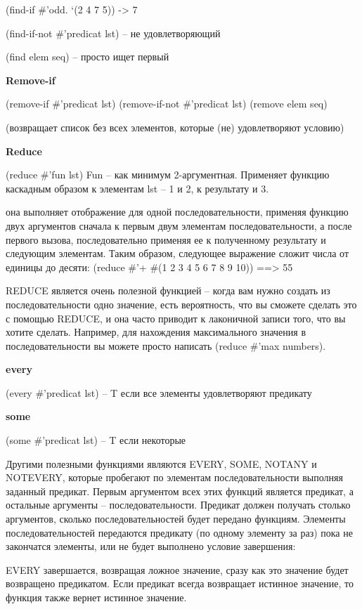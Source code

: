 \documentclass[12pt]{report}
\begin{document}
(find-if \#’odd. ‘(2 4 7 5)) -> 7

(find-if-not \#’predicat lst) – не удовлетворяющий

(find elem seq) -- просто ищет первый

\textbf{Remove-if}

(remove-if \#’predicat lst)
(remove-if-not \#’predicat lst)
(remove elem seq)

(возвращает список без всех элементов, которые (не) удовлетворяют условию)

\textbf{Reduce}

(reduce \#’fun lst)
Fun – как минимум 2-аргументная. Применяет функцию каскадным образом к элементам lst – 1 и 2, к результату и 3.


она выполняет отображение для одной последовательности, применяя функцию двух аргументов сначала к первым двум элементам последовательности, а после первого вызова, последовательно применяя ее к полученному результату и следующим элементам. Таким образом, следующее выражение сложит числа от единицы до десяти: (reduce \#'+ \#(1 2 3 4 5 6 7 8 9 10)) ==> 55

REDUCE является очень полезной функцией – когда вам нужно создать из последовательности одно значение, есть вероятность, что вы сможете сделать это с помощью REDUCE, и она часто приводит к лаконичной записи того, что вы хотите сделать. Например, для нахождения максимального значения в последовательности вы можете просто написать (reduce \#'max numbers). 


\textbf{every}

(every \#’predicat lst) – T если все элементы удовлетворяют предикату

\textbf{some}

(some \#’predicat lst) – T если некоторые

Другими полезными функциями являются EVERY, SOME, NOTANY и NOTEVERY, которые пробегают по элементам последовательности выполняя заданный предикат. Первым аргументом всех этих функций является предикат, а остальные аргументы – последовательности. Предикат должен получать столько аргументов, сколько последовательностей будет передано функциям. Элементы последовательностей передаются предикату (по одному элементу за раз) пока не закончатся элементы, или не будет выполнено условие завершения: 

EVERY завершается, возвращая ложное значение, сразу как это значение будет возвращено предикатом. Если предикат всегда возвращает истинное значение, то функция также вернет истинное значение.
\end{document}
